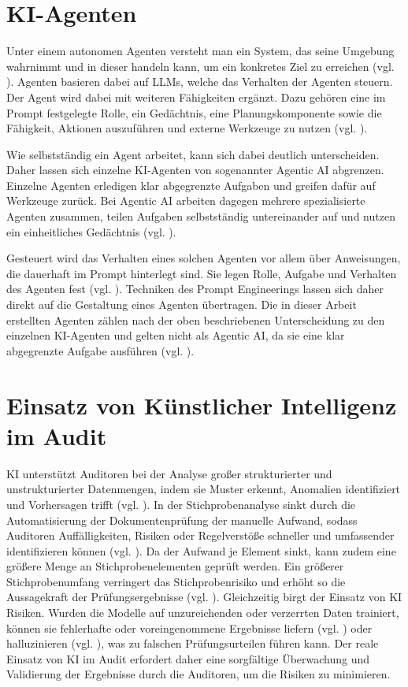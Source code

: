 \section{KI-Agenten}

Unter einem autonomen Agenten versteht man ein System, das seine Umgebung wahrnimmt und in dieser handeln kann, um ein konkretes Ziel zu erreichen (vgl. \cite[S. 1]{wang2024survey}). Agenten basieren dabei auf \acp{LLM}, welche das Verhalten der Agenten steuern. Der Agent wird dabei mit weiteren Fähigkeiten ergänzt. Dazu gehören eine im Prompt festgelegte Rolle, ein Gedächtnis, eine Planungskomponente sowie die Fähigkeit, Aktionen auszuführen und externe Werkzeuge zu nutzen (vgl. \cite[S. 6]{wang2024survey}).

Wie selbstständig ein Agent arbeitet, kann sich dabei deutlich unterscheiden. Daher lassen sich einzelne \ac{KI}-Agenten von sogenannter Agentic AI abgrenzen. Einzelne Agenten erledigen klar abgegrenzte Aufgaben und greifen dafür auf Werkzeuge zurück. Bei Agentic AI arbeiten dagegen mehrere spezialisierte Agenten zusammen, teilen Aufgaben selbstständig untereinander auf und nutzen ein einheitliches Gedächtnis (vgl. \cite[S. 5 f.]{sapkota2026agenticai}).

Gesteuert wird das Verhalten eines solchen Agenten vor allem über Anweisungen, die dauerhaft im Prompt hinterlegt sind. Sie legen Rolle, Aufgabe und Verhalten des Agenten fest (vgl. \cite[S. 6]{wang2024survey}). Techniken des Prompt Engineerings lassen sich daher direkt auf die Gestaltung eines Agenten übertragen. Die in dieser Arbeit erstellten Agenten zählen nach der oben beschriebenen Unterscheidung zu den einzelnen \ac{KI}-Agenten und gelten nicht als Agentic AI, da sie eine klar abgegrenzte Aufgabe ausführen (vgl. \cite[S. 1 ff.]{sapkota2026agenticai}).

\section{Einsatz von Künstlicher Intelligenz im Audit}

\ac{KI} unterstützt Auditoren bei der Analyse großer strukturierter und unstrukturierter Datenmengen, indem sie Muster erkennt, Anomalien identifiziert und Vorhersagen trifft (vgl. \cite[S.~56]{ivakhnenkov2023artificial}). In der Stichprobenanalyse sinkt durch die Automatisierung der Dokumentenprüfung der manuelle Aufwand, sodass Auditoren Auffälligkeiten, Risiken oder Regelverstöße schneller und umfassender identifizieren können (vgl. \cite[S.~11--12]{wassie2024artificial}). Da der Aufwand je Element sinkt, kann zudem eine größere Menge an Stichprobenelementen geprüft werden. Ein größerer Stichprobenumfang verringert das Stichprobenrisiko und erhöht so die Aussagekraft der Prüfungsergebnisse (vgl. \cite[S. 12]{isa530}).
Gleichzeitig birgt der Einsatz von \ac{KI} Risiken. Wurden die Modelle auf unzureichenden oder verzerrten Daten trainiert, können sie fehlerhafte oder voreingenommene Ergebnisse liefern (vgl. \cite[S. 13]{munoko2020ethical}) oder halluzinieren (vgl. \cite[S. 8]{huang2025survey}), was zu falschen Prüfungsurteilen führen kann. Der reale Einsatz von \ac{KI} im Audit erfordert daher eine sorgfältige Überwachung und Validierung der Ergebnisse durch die Auditoren, um die Risiken zu minimieren.